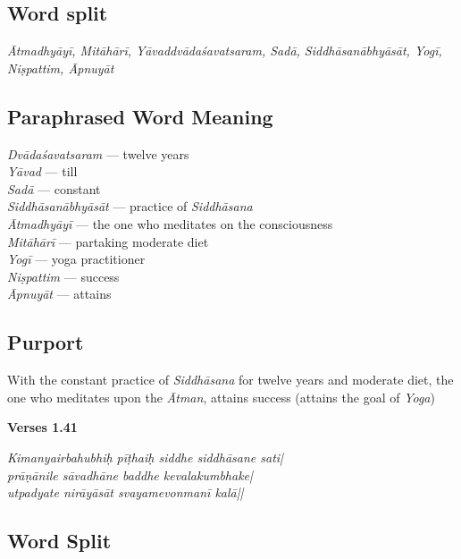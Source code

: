 \subsection*{Word split}

\textit{Ātmadhyāyī, Mitāhārī, Yāvaddvādaśavatsaram, Sadā, Siddhāsanābhyāsāt, Yogī, Niṣpattim, Āpnuyāt}

\subsection*{Paraphrased Word Meaning}

\begin{multicols}{2}
\itemsep=0pt
\textit{Dvādaśavatsaram} --- twelve years \\
\textit{Yāvad} --- till \\
\textit{Sadā} --- constant \\
\textit{Siddhāsanābhyāsāt} --- practice of \textit{Siddhāsana} \\
\textit{Ātmadhyāyī} --- the one who meditates on the consciousness \\
\textit{Mitāhārī} --- partaking moderate diet  \\
\textit{Yogī} --- yoga practitioner \\
\textit{Niṣpattim} ---  success  \\
\textit{Āpnuyāt} --- attains 
\end{multicols}

\subsection*{Purport}

With the constant practice of \textit{Siddhāsana} for twelve years and moderate diet, the one who meditates upon the \textit{Ātman},  attains success (attains the goal of \textit{Yoga})

\noindent \textbf{Verses 1.41}

\begin{shloka}
\textit{Kimanyairbahubhiḥ pīṭhaiḥ siddhe siddhāsane sati|\\
prāṇānile sāvadhāne baddhe kevalakumbhake|\\
utpadyate nirāyāsāt svayamevonmanī kalā||}
\end{shloka}

\subsection*{Word Split}

